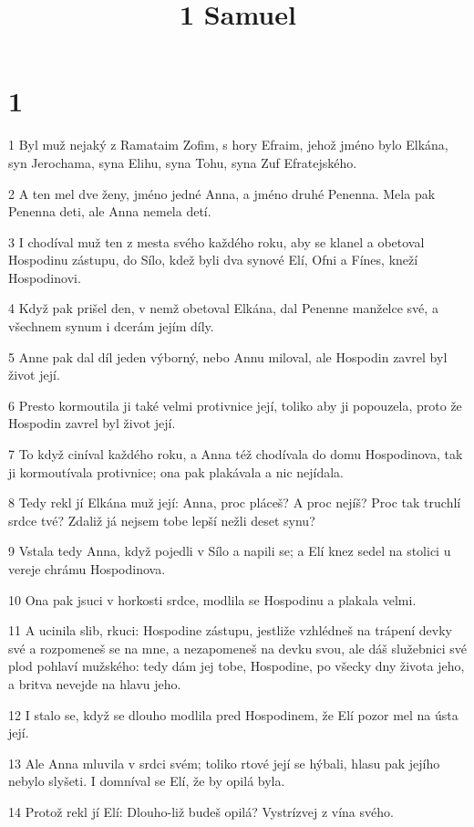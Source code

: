 

\title{1 Samuel}

\chapter{1}

\par 1 Byl muž nejaký z Ramataim Zofim, s hory Efraim, jehož jméno bylo Elkána, syn Jerochama, syna Elihu, syna Tohu, syna Zuf Efratejského.
\par 2 A ten mel dve ženy, jméno jedné Anna, a jméno druhé Penenna. Mela pak Penenna deti, ale Anna nemela detí.
\par 3 I chodíval muž ten z mesta svého každého roku, aby se klanel a obetoval Hospodinu zástupu, do Sílo, kdež byli dva synové Elí, Ofni a Fínes, kneží Hospodinovi.
\par 4 Když pak prišel den, v nemž obetoval Elkána, dal Penenne manželce své, a všechnem synum i dcerám jejím díly.
\par 5 Anne pak dal díl jeden výborný, nebo Annu miloval, ale Hospodin zavrel byl život její.
\par 6 Presto kormoutila ji také velmi protivnice její, toliko aby ji popouzela, proto že Hospodin zavrel byl život její.
\par 7 To když ciníval každého roku, a Anna též chodívala do domu Hospodinova, tak ji kormoutívala protivnice; ona pak plakávala a nic nejídala.
\par 8 Tedy rekl jí Elkána muž její: Anna, proc pláceš? A proc nejíš? Proc tak truchlí srdce tvé? Zdaliž já nejsem tobe lepší nežli deset synu?
\par 9 Vstala tedy Anna, když pojedli v Sílo a napili se; a Elí knez sedel na stolici u vereje chrámu Hospodinova.
\par 10 Ona pak jsuci v horkosti srdce, modlila se Hospodinu a plakala velmi.
\par 11 A ucinila slib, rkuci: Hospodine zástupu, jestliže vzhlédneš na trápení devky své a rozpomeneš se na mne, a nezapomeneš na devku svou, ale dáš služebnici své plod pohlaví mužského: tedy dám jej tobe, Hospodine, po všecky dny života jeho, a britva nevejde na hlavu jeho.
\par 12 I stalo se, když se dlouho modlila pred Hospodinem, že Elí pozor mel na ústa její.
\par 13 Ale Anna mluvila v srdci svém; toliko rtové její se hýbali, hlasu pak jejího nebylo slyšeti. I domníval se Elí, že by opilá byla.
\par 14 Protož rekl jí Elí: Dlouho-liž budeš opilá? Vystrízvej z vína svého.
